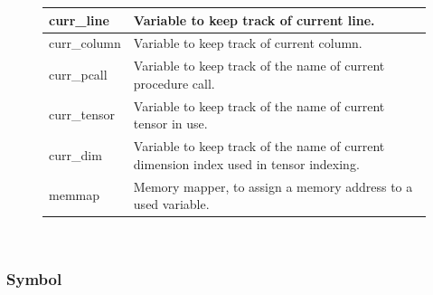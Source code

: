 \begin{figure}[H]
\begin{tabular}{p{1in}p{3in}}
        \midrule curr\_line &
        Variable to keep track of current line.\\

        \midrule curr\_column &
        Variable to keep track of current column.\\

        \midrule curr\_pcall &
        Variable to keep track of the name of current \newline procedure call.\\

        \midrule curr\_tensor &
        Variable to keep track of the name of current \newline tensor in use.\\

        \midrule curr\_dim &
        Variable to keep track of the name of current \newline dimension 
        index used in tensor indexing.\\

        \midrule memmap &
        Memory mapper, to assign a memory address to a used variable.\\

        \bottomrule
    \end{tabular}\\
\end{figure}

\newpage

\subsubsection{Symbol}

